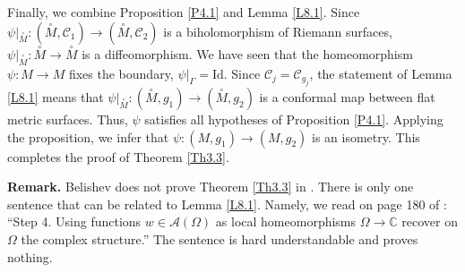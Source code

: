 \documentclass[12pt,reqno]{amsart}
\begin{document}
Finally, we combine Proposition \ref{P4.1} and Lemma \ref{L8.1}. Since
$\psi|_{\stackrel\circ M}:(\stackrel\circ M,{\mathcal C}_1)\to(\stackrel\circ M,{\mathcal C}_2)$ is a biholomorphism of Riemann surfaces,
$\psi|_{\stackrel\circ M}:\stackrel\circ M\to \stackrel\circ M$ is a diffeomorphism. We have seen that the homeomorphism $\psi:M\to M$ fixes the boundary, $\psi|_\Gamma=\mbox{Id}$. Since ${\mathcal C}_j={\mathcal C}_{g_j}$, the statement of Lemma \ref{L8.1} means that
$\psi|_{\stackrel\circ M}:(\stackrel\circ M,g_1)\to(\stackrel\circ M,g_2)$ is a conformal map between flat metric surfaces. Thus, $\psi$ satisfies all hypotheses of Proposition \ref{P4.1}. Applying the proposition, we infer that
$\psi:(M,g_1)\to(M,g_2)$ is an isometry. This completes the proof of Theorem \ref{Th3.3}.

{\bf Remark.} Belishev does not prove Theorem \ref{Th3.3} in \cite{Be}. There is only one sentence that can be related to Lemma \ref{L8.1}.
Namely, we read on page 180 of \cite{Be}: ``Step 4. Using functions $w\in{\mathcal A}(\Omega)$ as local homeomorphisms $\Omega\to{\mathbb C}$ recover on $\Omega$ the complex structure.'' The sentence is hard understandable and proves nothing.

\bigskip
\end{document}
